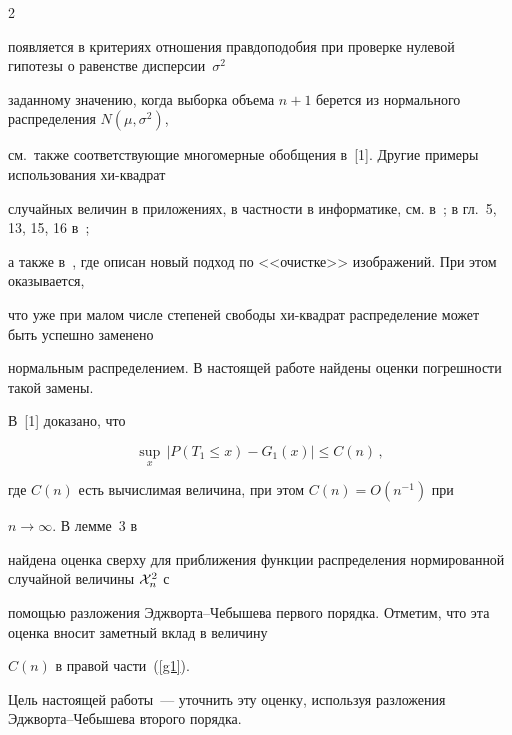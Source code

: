 \begin{multicols}{2}
\begin{equation*}


\end{equation*}


появляется в критериях отношения правдоподобия при проверке нулевой гипотезы  о равенстве дисперсии~$\sigma^2$ 


заданному значению, когда выборка объема $n+1$  берется из нормального распределения  $N(\mu, \sigma^2)$, 


см.\ также соответствующие многомерные обобщения в~[1]. Другие примеры использования хи-квад\-рат 


случайных величин в приложениях, в частности  в информатике, см. в~\cite{9-cr}; в гл.~5, 13, 15, 16 в~\cite{2-cr}; 


а также в~\cite{10-cr}, где описан новый подход по <<очистке>> изображений. При этом оказывается, 


что уже при  малом числе степеней свободы хи-квад\-рат распределение может быть успешно заменено 


нормальным распределением. В настоящей работе найдены оценки погрешности такой замены. 


В~[1] доказано, что


\begin{equation}


\label{g1}


\sup_x\,|P (T_1 \leq x) - G_1 (x)| \leq C(n)\,,


\end{equation}


где  $C(n)$ есть вычислимая величина, при этом  $C(n) = O(n^{-1})$ при


$n \rightarrow\infty$. В лемме~3 в~\cite{1-cr}


найдена оценка сверху для приближения функции распределения нормированной случайной величины ${\cal X}_n^2$ с 


помощью разложения Эджворта--Чебышева первого порядка. Отметим, что эта оценка вносит заметный вклад в величину


 $C(n)$  в правой части~(\ref{g1}).


 


 \smallskip


 


Цель настоящей работы~--- уточнить эту оценку, используя  разложения Эджворта--Чебышева второго порядка.


\smallskip






\end{multicols}
